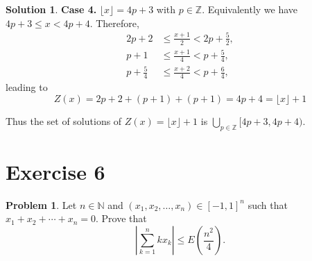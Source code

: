 \documentclass{article}
\theoremstyle{definition}
\newtheorem{problem}{Problem}
\newtheorem*{solution}{Solution}
\begin{document}
\begin{solution}
\textbf{Case 4.} $\lfloor x \rfloor = 4p + 3$ with $p \in \mathbb{Z}$. Equivalently we have $4p + 3 \leq x < 4p + 4$. Therefore,
\begin{align*}
2p + 2 &\leq \frac{x + 1}{2} < 2p + \frac{5}{2}, \\
p + 1 &\leq \frac{x + 1}{4} < p + \frac{5}{4}, \\
p + \frac{5}{4} &\leq \frac{x + 2}{4} < p + \frac{6}{4},
\end{align*}
leading to
\[
Z(x) = 2p + 2 + (p + 1) + (p + 1) = 4p + 4 = \lfloor x \rfloor + 1
\]

Thus the set of solutions of $Z(x) = \lfloor x \rfloor + 1$ is $\bigcup_{p\in\mathbb{Z}} [4p + 3, 4p + 4)$.
\end{solution}


\section*{Exercise 6}

\begin{problem}
Let $n \in \mathbb{N}$ and $(x_1, x_2, \ldots, x_n) \in [-1, 1]^n$ such that $x_1 + x_2 + \cdots + x_n = 0$. Prove that
\[
\left| \sum_{k=1}^n kx_k \right| \leq E\left( \frac{n^2}{4} \right).
\]
\end{problem}
\end{document}
